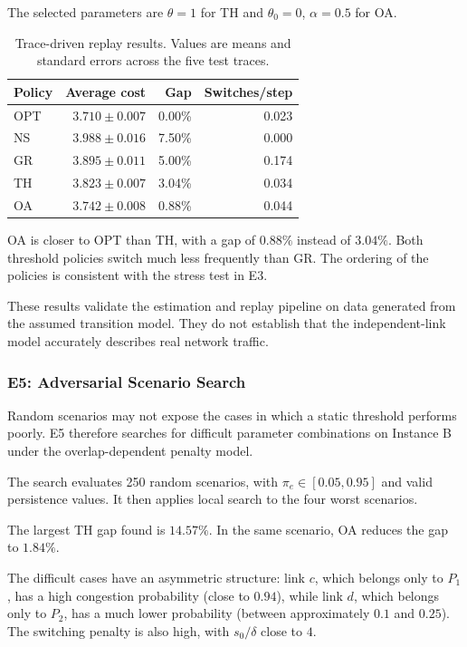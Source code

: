 \documentclass{amsart}
\begin{document}
The selected parameters are $\theta=1$ for TH and
$\theta_0=0$, $\alpha=0.5$ for OA.

\begin{table}[ht]
\centering
\begin{tabular}{lrrr}
\hline
Policy & Average cost & Gap & Switches/step \\
\hline
OPT & $3.710\pm0.007$ & 0.00\% & 0.023 \\
NS  & $3.988\pm0.016$ & 7.50\% & 0.000 \\
GR  & $3.895\pm0.011$ & 5.00\% & 0.174 \\
TH  & $3.823\pm0.007$ & 3.04\% & 0.034 \\
OA  & $3.742\pm0.008$ & 0.88\% & 0.044 \\
\hline
\end{tabular}
\caption{Trace-driven replay results. Values are means and standard
errors across the five test traces.}
\label{tab:e4}
\end{table}

OA is closer to OPT than TH, with a gap of $0.88\%$ instead of
$3.04\%$. Both threshold policies switch much less frequently than
GR. The ordering of the policies is consistent with the stress
test in E3.

These results validate the estimation and replay pipeline on data
generated from the assumed transition model. They do not establish
that the independent-link model accurately describes real network
traffic.

\subsubsection{E5: Adversarial Scenario Search}

Random scenarios may not expose the cases in which a static
threshold performs poorly. E5 therefore searches for difficult
parameter combinations on Instance B under the overlap-dependent
penalty model.

The search evaluates 250 random scenarios, with
$\pi_e\in[0.05,0.95]$ and valid persistence values. It then applies
local search to the four worst scenarios.

The largest TH gap found is $14.57\%$. In the same scenario, OA
reduces the gap to $1.84\%$.

The difficult cases have an asymmetric structure: link $c$,
which belongs only to $P_1$, has a high congestion probability
(close to $0.94$), while link $d$, which belongs only to $P_2$,
has a much lower probability (between approximately $0.1$ and
$0.25$). The switching penalty is also high, with
$s_0/\delta$ close to $4$.
\end{document}
